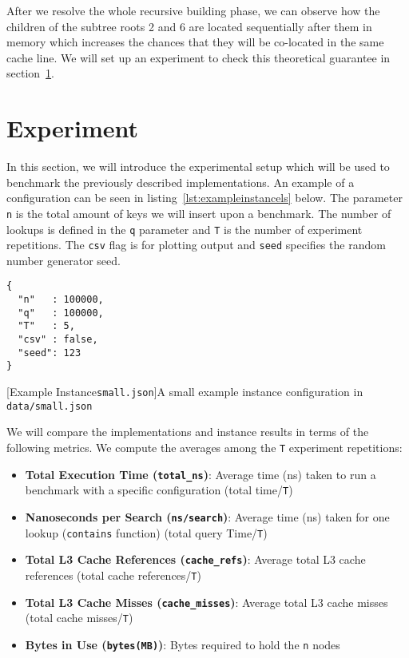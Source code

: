 \documentclass{article}
\begin{document}

After we resolve the whole recursive building phase, we can observe how the children of the subtree roots 2 and 6 are located sequentially after them in memory which increases the chances that they will be co-located in the same cache line. We will set up an experiment to check this theoretical guarantee in section~\ref{sec:ex}.


\section{Experiment}
\label{sec:ex}
In this section, we will introduce the experimental setup which will be used to benchmark the previously described implementations.  An example of a configuration can be seen in listing~\ref{lst:exampleinstancels} below. The parameter \texttt{n} is the total amount of keys we will insert upon a benchmark. The number of lookups is defined in the \texttt{q} parameter and \texttt{T} is the number of experiment repetitions. The \texttt{csv} flag is for plotting output and \texttt{seed} specifies the random number generator seed.
\begin{lstlisting}
{
  "n"   : 100000,
  "q"   : 100000,
  "T"   : 5,
  "csv" : false,
  "seed": 123
}
\end{lstlisting}
[Example Instance\texttt{small.json}]{A small example instance configuration in \texttt{data/small.json}}
\label{lst:exampleinstancels}


We will compare the implementations and instance results in terms of the following metrics. We compute the averages among the \texttt{T} experiment repetitions:
\begin{itemize}
    \item \textbf{Total Execution Time (\texttt{total\_ns})}: Average time (ns) taken to run a benchmark with a specific configuration (total time/\texttt{T})
    \item \textbf{Nanoseconds per Search (\texttt{ns/search})}: Average time (ns) taken for one lookup (\texttt{contains} function) (total query Time/\texttt{T})
    \item \textbf{Total L3 Cache References (\texttt{cache\_refs})}: Average total L3 cache references (total cache references/\texttt{T})
    \item \textbf{Total L3 Cache Misses (\texttt{cache\_misses})}: Average total L3 cache misses (total cache misses/\texttt{T})
    \item \textbf{Bytes in Use (\texttt{bytes(MB)})}: Bytes required to hold the \texttt{n} nodes
\end{itemize}
\end{document}
